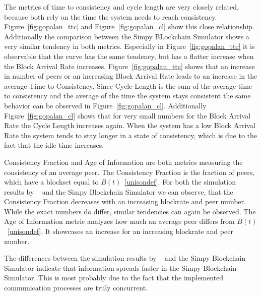 The metrics of time to consistency and cycle length are very closely related, because both rely on the time the system needs to reach consistency.
Figure~\ref{fig:gopalan_ttc} and Figure~\ref{fig:gopalan_cl} show this close relationship. Additionally the comparison between the Simpy BLockchain Simulator shows a very similar tendency in both metrics. Especially in Figure~\ref{fig:gopalan_ttc} it is observable that the curve has the same tendency, but has a flatter increase when the Block Arrival Rate increases. Figure~\ref{fig:gopalan_ttc} shows that an increase in number of peers or an increasing Block Arrival Rate leads to an increase in the average Time to Consistency. Since Cycle Length is the sum of the average time to consistency and the average of the time the system stays consistent the same behavior can be observed in Figure~\ref{fig:gopalan_cl}. Additionally Figure~\ref{fig:gopalan_cl} shows that for very small numbers for the Block Arrival Rate the Cycle Length increases again. When the system has a low Block Arrival Rate the system tends to stay longer in a state of consistency, which is due to the fact that the idle time increases.

Consistency Fraction and Age of Information are both metrics measuring the consistency of an average peer. The Consistency Fraction is the fraction of peers, which have a blockset equal to $B(t)$~\ref{unisondef}. For both the simulation results by \gopalan~ and the Simpy Blockchain Simulator we can observe, that the Consistency Fraction decreases with an increasing blockrate and peer number. While the exact numbers do differ, similar tendencies can again be observed.
The Age of Information metric analyzes how much an average peer differs from $B(t)$~\ref{unisondef}. It showcases an increase for an increasing blockrate and peer number.

The differences between the simulation results by \gopalan~ and the Simpy Blockchain Simulator indicate that information spreads faster in the Simpy Blockchain Simulator. This is most probably due to the fact that the implemented communication processes are truly concurrent.	


